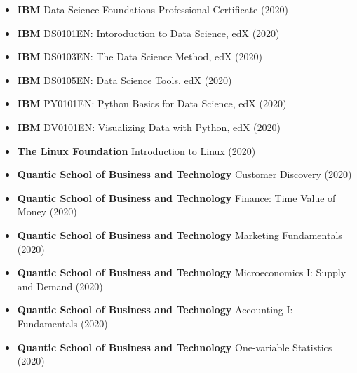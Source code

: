 \documentclass[11pt,letterpaper,sans]{moderncv} %
\begin{document}
\begin{itemize}

	\item \textbf{IBM} Data Science Foundations Professional Certificate (2020)
	\item \textbf{IBM} DS0101EN: Intoroduction to Data Science, edX (2020)
	\item \textbf{IBM} DS0103EN: The Data Science Method, edX (2020)
	\item \textbf{IBM} DS0105EN: Data Science Tools, edX (2020)
	\item \textbf{IBM} PY0101EN: Python Basics for Data Science, edX (2020)
	\item \textbf{IBM} DV0101EN: Visualizing Data with Python, edX (2020)
	\item \textbf{The Linux Foundation} Introduction to Linux (2020)
	\item \textbf{Quantic School of Business and Technology} Customer Discovery (2020)
	\item \textbf{Quantic School of Business and Technology} Finance: Time Value of Money (2020)
        \item \textbf{Quantic School of Business and Technology} Marketing Fundamentals (2020)
	\item \textbf{Quantic School of Business and Technology} Microeconomics I: 
								   Supply and Demand (2020)
	\item \textbf{Quantic School of Business and Technology} Accounting I: Fundamentals (2020)
	\item \textbf{Quantic School of Business and Technology} One-variable Statistics (2020)
	

\end{itemize}






\end{document}
